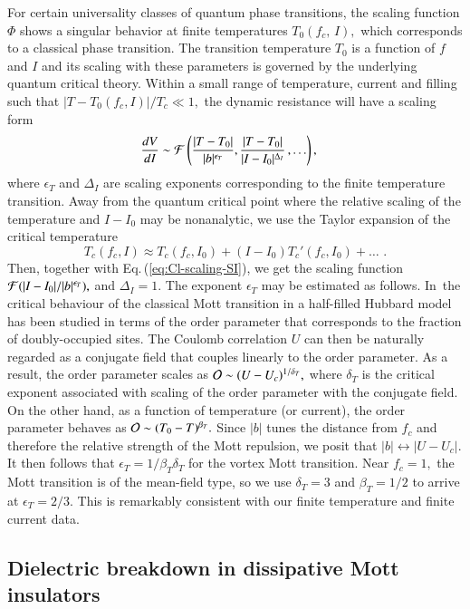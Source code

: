 \documentclass[aps,twocolumn,prl,10pt,amsmath,amssymb,nofootinbib,showpacs,superscriptaddress,floatfix]{revtex4-1}
\begin{document}
For certain universality classes of quantum phase transitions, the
scaling function $\Phi$ shows a singular behavior at finite temperatures
$T_{0}(f_{c},\, I),$ which corresponds to a classical phase transition.
The transition temperature $T_{0}$ is a function of $f$
and $I$ and its scaling with these parameters is governed by the
underlying quantum critical theory. Within a small range of temperature,
current and filling such that $|T-T_{0}(f_{c},I)|/T_{c}\ll1,$ the
dynamic resistance will have a scaling form 
\begin{align}
	\frac{dV}{dI} & \sim{\cal F}\left(\frac{|T-T_{0}|}{|b|^{\epsilon_T}},\frac{|T-T_{0}|}{|I-I_{0}|^{\Delta_{I}}}\,,\ldots\right),\label{eq:Cl-scaling-SI}
\end{align}
where $\epsilon_T$ and $\Delta_{I}$ are scaling
exponents corresponding to the finite temperature transition.
Away from the quantum critical point where the relative scaling of
the temperature and $I-I_{0}$ may be nonanalytic, we use the Taylor
expansion of the critical temperature 
$$
T_{c}(f_{c},I)\approx T_{c}(f_{c},I_{0})+(I-I_{0})T_{c}'(f_{c},I_{0})+\ldots\,\,.
$$
Then, together with Eq.\,(\ref{eq:Cl-scaling-SI}), we get the scaling
function ${\cal F}(|I-I_{0}|/|b|^{\epsilon_{T}}),$ and $\Delta_{I}=1.$
The exponent $\epsilon_T$ may be estimated as follows. In\,\cite{kotliar}
the critical behaviour of the classical Mott transition in a half-filled
Hubbard model has been studied in terms of the order parameter that
corresponds to the fraction of doubly-occupied sites. The Coulomb
correlation $U$ can then be naturally regarded as a conjugate field
that couples linearly to the order parameter. As a result, the order
parameter scales as ${\cal O}\sim(U-U_{c})^{1/\delta_T},$
where $\delta_T$ is the critical exponent associated with
scaling of the order parameter with the conjugate field. On the other
hand, as a function of temperature (or current), the order parameter
behaves as ${\cal O}\sim(T_{0}-T)^{\beta_T}.$ Since $|b|$
tunes the distance from $f_{c}$ and therefore the relative strength
of the Mott repulsion, we posit that $|b|\leftrightarrow|U-U_{c}|.$
It then follows that $\epsilon_T = 1/\beta_T\delta_T$
for the vortex Mott transition. Near $f_{c}=1,$ the Mott transition is of the mean-field type, so 
we use $\delta_T=3$ and $\beta_T=1/2$
to arrive at $\epsilon_T=2/3.$ This is remarkably consistent
with our finite temperature and finite current data. 

\subsection{Dielectric breakdown in dissipative Mott insulators\label{sec:Dielectric-breakdown}}
\end{document}
